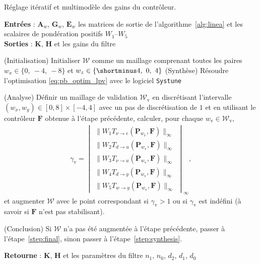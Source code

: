\begin{algorithm}
  \caption{Réglage itératif et multimodèle des gains du contrôleur.}
  \label{alg:iterativeOptimisation}
  \hspace*{.1cm} \textbf{Entrées} : $\boldsymbol{A}_{w}$, $\boldsymbol{G}_{w}$, $\boldsymbol{E}_{w}$  les matrices de sortie de l'algorithme~\ref{alg:linea} et les scalaires de pondération positifs $W_1$--$W_5$\\
  \hspace*{.1cm} \textbf{Sorties} : $\boldsymbol{K}$, $\boldsymbol{H}$ et les gains du filtre
  \begin{algorithmic}[1]
   
    \State (Initialisation) Initialiser ${\mathcal W}$ comme un maillage comprenant toutes les paires $ w_{x} \in \{0,~-4,~-8\}$ et $ w_{z} \in \{\shortminus 4,~0,~4\}$
    \State \label{step:synthesis} (Synthèse) Résoudre l'optimisation \eqref{eq:pb_optim_lpv} avec le logiciel {\tt Systune}

    \State \label{step:analysis} (Analyse) Définir un maillage de validation ${\mathcal W}_{\text{v}}$ en discrétisant l'intervalle $(w_x,w_y) \in [0,8]\times[-4,4]$ avec un pas de discrétisation de $1$ et 
    en utilisant le contrôleur $\boldsymbol{F}$ obtenue à l'étape précédente, calculer, pour chaque $w_{\text{v}}\in {\mathcal W}_{\text{v}}$,
    \begin{align}
    \label{eq:validation_step}
    \gamma_{\text{v}} = \begin{vmatrix}
    \| W_{1} T_{\nu \rightarrow e}(\boldsymbol{P}_{w_{\text{v}}},\boldsymbol{F})\|_{\infty} \\
    \|W_{2} T_{d \rightarrow u}(\boldsymbol{P}_{w_{\text{v}}},\boldsymbol{F})\|_{\infty}\\
    \|W_{3} T_{\nu \rightarrow u}(\boldsymbol{P}_{w_{\text{v}}},\boldsymbol{F})\|_{\infty}\\
    \|W_{4} T_{d \rightarrow y}(\boldsymbol{P}_{w_{\text{v}}},\boldsymbol{F})\|_{\infty}\\
    \|W_{5} T_{w \rightarrow y}(\boldsymbol{P}_{w_{\text{v}}},\boldsymbol{F})\|_{\infty}
    \end{vmatrix}_{\infty} ,
    \end{align}
    et augmenter  ${\mathcal W}$ avec le point correspondant si $\gamma_{\text{v}} > 1$ ou si $\gamma_{\text{v}}$ est indéfini (à savoir si $\boldsymbol{F}$ n'est pas stabilisant).


    \State (Conclusion) Si ${\mathcal W}$ n'a pas été augmentée à l'étape précédente, passer à l'étape~\ref{step:final}, sinon passer à l'étape~\ref{step:synthesis}.
    
    \State \label{step:final} 
    \textbf{Retourne} : $\boldsymbol{K}$, $\boldsymbol{H}$ et les paramètres du filtre $n_1$, $n_0$,  $d_2$,  $d_1$,  $d_0$

  \end{algorithmic}
\end{algorithm}

